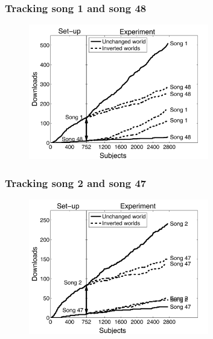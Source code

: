 \documentclass[aspectratio=169]{beamer}
\begin{document}
\begin{frame}
\frametitle{Tracking song 1 and song 48}

\begin{figure}
  \centering
  \includegraphics[width=0.7\textwidth]{figures/pair1_34_asa3}
\end{figure}

\end{frame}
\begin{frame}
\frametitle{Tracking song 2 and song 47}

\begin{figure}
  \centering
  \includegraphics[width=0.7\textwidth]{figures/pair2_34_asa}
\end{figure}

\end{frame}
\end{document}
